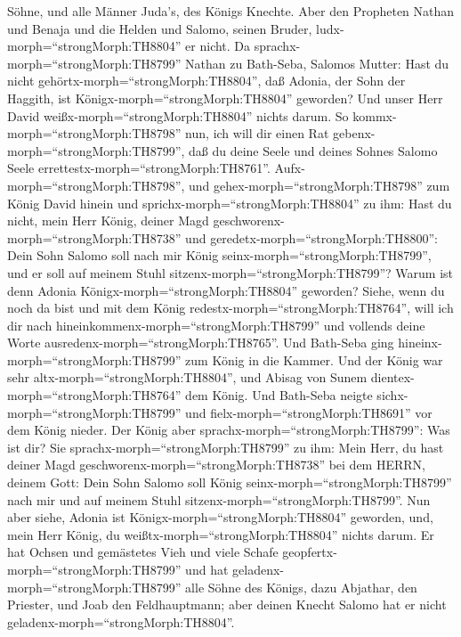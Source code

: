 Söhne, und alle Männer Juda's, des Königs Knechte.  Aber
den Propheten Nathan und Benaja und die Helden und Salomo, seinen
Bruder, ludx-morph=``strongMorph:TH8804'' er nicht.  Da
sprachx-morph=``strongMorph:TH8799'' Nathan zu Bath-Seba, Salomos
Mutter: Hast du nicht gehörtx-morph=``strongMorph:TH8804'', daß Adonia,
der Sohn der Haggith, ist Königx-morph=``strongMorph:TH8804'' geworden?
Und unser Herr David weißx-morph=``strongMorph:TH8804'' nichts darum.
 So kommx-morph=``strongMorph:TH8798'' nun, ich will dir
einen Rat gebenx-morph=``strongMorph:TH8799'', daß du deine Seele und
deines Sohnes Salomo Seele errettestx-morph=``strongMorph:TH8761''.
 Aufx-morph=``strongMorph:TH8798'', und
gehex-morph=``strongMorph:TH8798'' zum König David hinein und
sprichx-morph=``strongMorph:TH8804'' zu ihm: Hast du nicht, mein Herr
König, deiner Magd geschworenx-morph=``strongMorph:TH8738'' und
geredetx-morph=``strongMorph:TH8800'': Dein Sohn Salomo soll nach mir
König seinx-morph=``strongMorph:TH8799'', und er soll auf meinem Stuhl
sitzenx-morph=``strongMorph:TH8799''? Warum ist denn Adonia
Königx-morph=``strongMorph:TH8804'' geworden?  Siehe, wenn
du noch da bist und mit dem König redestx-morph=``strongMorph:TH8764'',
will ich dir nach hineinkommenx-morph=``strongMorph:TH8799'' und
vollends deine Worte ausredenx-morph=``strongMorph:TH8765''.
 Und Bath-Seba ging hineinx-morph=``strongMorph:TH8799''
zum König in die Kammer. Und der König war sehr
altx-morph=``strongMorph:TH8804'', und Abisag von Sunem
dientex-morph=``strongMorph:TH8764'' dem König.  Und
Bath-Seba neigte sichx-morph=``strongMorph:TH8799'' und
fielx-morph=``strongMorph:TH8691'' vor dem König nieder. Der König aber
sprachx-morph=``strongMorph:TH8799'': Was ist dir?  Sie
sprachx-morph=``strongMorph:TH8799'' zu ihm: Mein Herr, du hast deiner
Magd geschworenx-morph=``strongMorph:TH8738'' bei dem HERRN, deinem
Gott: Dein Sohn Salomo soll König seinx-morph=``strongMorph:TH8799''
nach mir und auf meinem Stuhl sitzenx-morph=``strongMorph:TH8799''.
 Nun aber siehe, Adonia ist
Königx-morph=``strongMorph:TH8804'' geworden, und, mein Herr König, du
weißtx-morph=``strongMorph:TH8804'' nichts darum.  Er hat
Ochsen und gemästetes Vieh und viele Schafe
geopfertx-morph=``strongMorph:TH8799'' und hat
geladenx-morph=``strongMorph:TH8799'' alle Söhne des Königs, dazu
Abjathar, den Priester, und Joab den Feldhauptmann; aber deinen Knecht
Salomo hat er nicht geladenx-morph=``strongMorph:TH8804''. 
